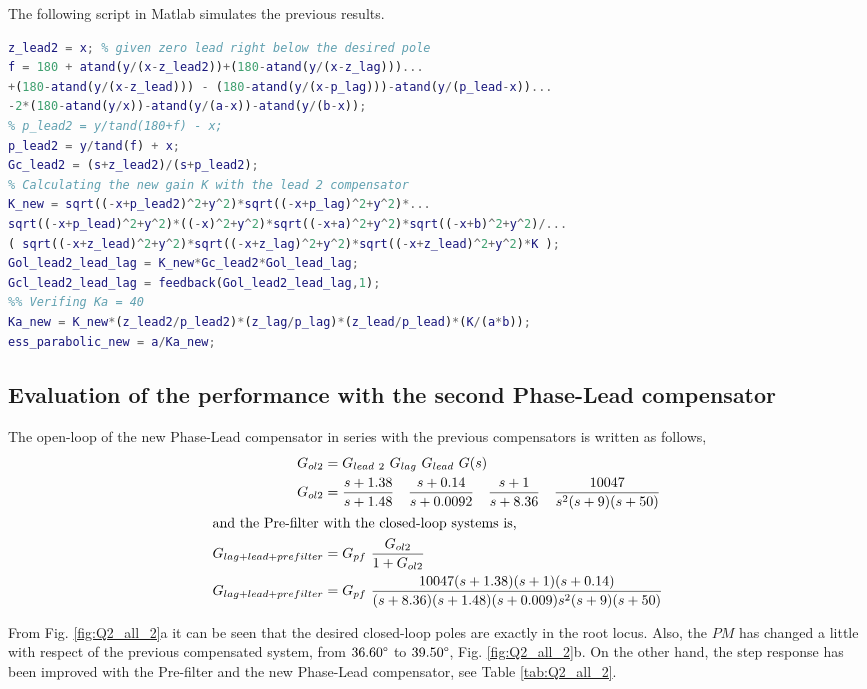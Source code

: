 \documentclass[11pt, a4paper]{article}
\begin{document}
The following script in Matlab simulates the previous results.
\begin{lstlisting}[language=matlab, caption={}, label={}]
%% New phase-lead compensator
z_lead2 = x; % given zero lead right below the desired pole
f = 180 + atand(y/(x-z_lead2))+(180-atand(y/(x-z_lag)))...
+(180-atand(y/(x-z_lead))) - (180-atand(y/(x-p_lag)))-atand(y/(p_lead-x))...
-2*(180-atand(y/x))-atand(y/(a-x))-atand(y/(b-x));
% p_lead2 = y/tand(180+f) - x;
p_lead2 = y/tand(f) + x;
Gc_lead2 = (s+z_lead2)/(s+p_lead2);
% Calculating the new gain K with the lead 2 compensator
K_new = sqrt((-x+p_lead2)^2+y^2)*sqrt((-x+p_lag)^2+y^2)*...
sqrt((-x+p_lead)^2+y^2)*((-x)^2+y^2)*sqrt((-x+a)^2+y^2)*sqrt((-x+b)^2+y^2)/...
( sqrt((-x+z_lead)^2+y^2)*sqrt((-x+z_lag)^2+y^2)*sqrt((-x+z_lead)^2+y^2)*K );
Gol_lead2_lead_lag = K_new*Gc_lead2*Gol_lead_lag;
Gcl_lead2_lead_lag = feedback(Gol_lead2_lead_lag,1);
%% Verifing Ka = 40 
Ka_new = K_new*(z_lead2/p_lead2)*(z_lag/p_lag)*(z_lead/p_lead)*(K/(a*b));
ess_parabolic_new = a/Ka_new; 
\end{lstlisting}


\subsection{Evaluation of the performance with the second Phase-Lead compensator}
The open-loop of the new Phase-Lead compensator in series with the previous compensators is written as follows,
\begin{align}
G_{ol2} &= G_{lead~2}~G_{lag}~G_{lead} ~G(s) \label{eq:Gol_lead_lag_lead2}\\ 
G_{ol2} &= \dfrac{s+1.38}{s+1.48}\quad \dfrac{s+0.14}{s+0.0092} \quad \dfrac{s+1}{s+8.36} \quad \dfrac{10047}{s^2(s+9)(s+50)}  \nonumber\\
\intertext{and the Pre-filter with the closed-loop systems is,}
G_{lag+lead+prefilter} &= G_{pf}~ \dfrac{G_{ol2}}{1+G_{ol2}} \\
G_{lag+lead+prefilter} &= G_{pf}~ \dfrac{10047(s+1.38)(s+1)(s+0.14)}{(s+8.36)(s+1.48)(s+0.009)s^2(s+9)(s+50)} \nonumber
\end{align}

From Fig. \ref{fig:Q2_all_2}a it can be seen that the desired closed-loop poles are exactly in the root locus. Also, the $PM$ has changed a little with respect of the previous compensated system, from $36.60\degree$ to $39.50\degree$, Fig. \ref{fig:Q2_all_2}b. On the other hand, the step response has been improved with the Pre-filter and the new Phase-Lead compensator, see Table \ref{tab:Q2_all_2}.
\end{document}
